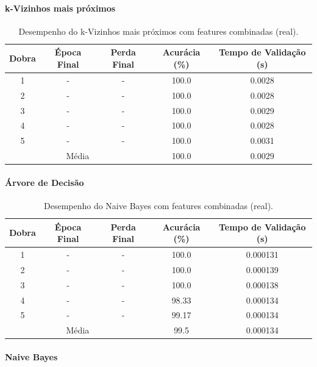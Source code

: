 \paragraph{k-Vizinhos mais próximos}

\begin{table}[H]
\caption{Desempenho do k-Vizinhos mais próximos com features combinadas (real).}
\centering
\begin{tabular}{ccccc}
\hline
\textbf{Dobra} & \textbf{Época Final} & \textbf{Perda Final} & \textbf{Acurácia (\%)} & \textbf{Tempo de Validação (s)}  \\
\hline
1 & - & - & 100.0 & 0.0028 \\
2 & - & - & 100.0 & 0.0028 \\
3 & - & - & 100.0 & 0.0029 \\
4 & - & - & 100.0 & 0.0028 \\
5 & - & - & 100.0 & 0.0031 \\
\hline
\multicolumn{3}{c}{Média} & 100.0 & 0.0029 \\
\hline
\end{tabular}
\fonte{}
\label{tab:resultados_knn_imagens_real}
\end{table}


\paragraph{Árvore de Decisão}

\begin{table}[H]
\caption{Desempenho do Naive Bayes com features combinadas (real).}
\centering
\begin{tabular}{ccccc}
\hline
\textbf{Dobra} & \textbf{Época Final} & \textbf{Perda Final} & \textbf{Acurácia (\%)} & \textbf{Tempo de Validação (s)}  \\
\hline
1 & - & - & 100.0 & 0.000131 \\
2 & - & - & 100.0 & 0.000139 \\
3 & - & - & 100.0 & 0.000138 \\
4 & - & - & 98.33 & 0.000134 \\
5 & - & - & 99.17 & 0.000134 \\
\hline
\multicolumn{3}{c}{Média} & 99.5 & 0.000134 \\
\hline
\end{tabular}
\fonte{}
\label{tab:resultados_naive_imagens_real}
\end{table}

\paragraph{Naive Bayes}


